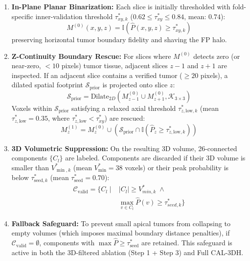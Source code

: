 \documentclass[11pt,a4paper]{article}
\begin{document}
\begin{enumerate}
    \item \textbf{In-Plane Planar Binarization:} Each slice is initially thresholded with fold-specific inner-validation threshold $\tau_{xy, k}^*$ ($0.62 \le \tau_{xy}^* \le 0.84$, mean: $0.74$):
    \begin{equation}
    M^{(0)}(x, y, z) = \mathbb{I}\left( \hat{P}(x, y, z) \ge \tau_{xy, k}^* \right)
    \end{equation}
    preserving horizontal tumor boundary fidelity and shaving the FP halo.
    \item \textbf{Z-Continuity Boundary Rescue:} For slices where $M^{(0)}$ detects zero (or near-zero, $< 10$ pixels) tumor tissue, adjacent slices $z-1$ and $z+1$ are inspected. If an adjacent slice contains a verified tumor ($\ge 20$ pixels), a dilated spatial footprint $\mathcal{S}_{\text{prior}}$ is projected onto slice $z$:
    \begin{equation}
    \mathcal{S}_{\text{prior}} = \text{Dilate}_{2D}\left(M^{(0)}_{z-1} \cup M^{(0)}_{z+1}, \mathcal{K}_{3\times 3}\right)
    \end{equation}
    Voxels within $\mathcal{S}_{\text{prior}}$ satisfying a relaxed axial threshold $\tau_{z,\mathrm{low}, k}^*$ (mean $\tau_{z,\mathrm{low}}^* = 0.35$, where $\tau_{z,\mathrm{low}}^* < \tau_{xy}^*$) are rescued:
    \begin{equation}
    M^{(1)}_z = M^{(0)}_z \cup \left( \mathcal{S}_{\text{prior}} \cap \mathbb{I}(\hat{P}_z \ge \tau_{z,\mathrm{low}, k}^*) \right)
    \end{equation}
    \item \textbf{3D Volumetric Suppression:} On the resulting 3D volume, 26-connected components $\{C_l\}$ are labeled. Components are discarded if their 3D volume is smaller than $V_{\min, k}^*$ (mean $V_{\min}^* = 38$ voxels) or their peak probability is below $\tau_{\mathrm{seed}, k}^*$ (mean $\tau_{\mathrm{seed}}^* = 0.70$):
    \begin{equation}
    \begin{aligned}
    \mathcal{C}_{\text{valid}} = \big\{ C_l \mid &|C_l| \ge V_{min, k}^* \;\land \\
    &\max_{v \in C_l} \hat{P}(v) \ge \tau_{seed, k}^* \big\}
    \end{aligned}
    \end{equation}
    \item \textbf{Fallback Safeguard:} To prevent small apical tumors from collapsing to empty volumes (which imposes maximal boundary distance penalties), if $\mathcal{C}_{\text{valid}} = \emptyset$, components with $\max \hat{P} \ge \tau_{\mathrm{seed}}^*$ are retained. This safeguard is active in both the 3D-filtered ablation (Step 1 + Step 3) and Full CAL-3DH.
\end{enumerate}
\end{document}
